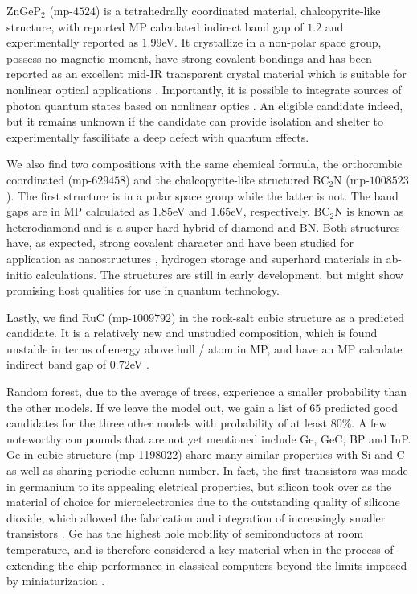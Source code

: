 ZnGeP$_2$ (mp-$4524$) is a tetrahedrally coordinated material, chalcopyrite-like structure, with reported MP calculated indirect band gap of $1.2$ \cite{Zhang2015} and experimentally reported as $1.99$eV\cite{Xing1989}. It crystallize in a non-polar space group, possess no magnetic moment, have strong covalent bondings and has been reported as an excellent mid-IR transparent crystal material which is suitable for nonlinear optical applications \cite{Zhang2015}. Importantly, it is possible to integrate sources of photon quantum states based on nonlinear optics \cite{Caspani2017}. An eligible candidate indeed, but it remains unknown if the candidate can provide isolation and shelter to experimentally fascilitate a deep defect with quantum effects.

We also find two compositions with the same chemical formula, the orthorombic coordinated (mp-$629458$) and the chalcopyrite-like structured BC$_2$N (mp-$1008523$). The first structure is in a polar space group while the latter is not. The band gaps are in MP calculated as $1.85$eV and $1.65$eV, respectively. BC$_2$N is known as heterodiamond and is a super hard hybrid of diamond and BN. Both structures have, as expected, strong covalent character and have been studied for application as nanostructures \cite{Gao2017}, hydrogen storage \cite{Cai2017} and superhard materials \cite{Li2017, Jiang2020} in ab-initio calculations. The structures are still in early development, but might show promising host qualities for use in quantum technology.

Lastly, we find RuC (mp-$1009792$) in the rock-salt cubic structure as a predicted candidate. It is a relatively new and unstudied composition, which is found unstable in terms of energy above hull / atom in MP, and have an MP calculate indirect band gap of $0.72$eV \cite{RuC2020}.

Random forest, due to the average of trees, experience a smaller probability than the other models. If we leave the model out, we gain a list of $65$ predicted good candidates for the three other models with probability of at least $80\%$. A few noteworthy compounds that are not yet mentioned include Ge, GeC, BP and InP. Ge in cubic structure (mp-1198022) share many similar properties with Si and C as well as sharing periodic column number. In fact, the first transistors was made in germanium to its appealing eletrical properties, but silicon took over as the material of choice for microelectronics due to the outstanding quality of silicone dioxide, which allowed the fabrication and integration of increasingly smaller transistors \cite{Scappucci2020, Pillarisetty2011}. Ge has the highest hole mobility of semiconductors at room temperature, and is therefore considered a key material when in the process of extending the chip performance in classical computers beyond the limits imposed by miniaturization \cite{Scappucci2020}.


